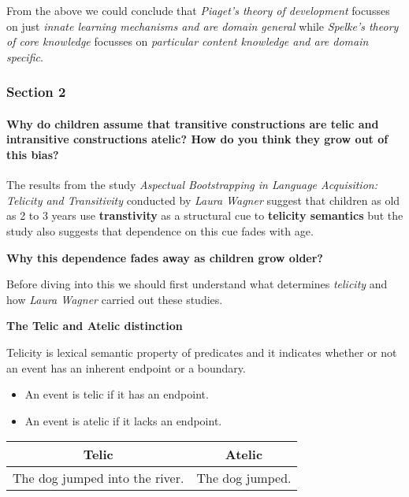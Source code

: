 \documentclass[11pt]{article}
\providecommand{\tightlist}{%
      \setlength{\itemsep}{0pt}\setlength{\parskip}{0pt}}
\begin{document}
From the above we could conclude that \emph{Piaget's theory of
development} focusses on just \emph{innate learning mechanisms and are
domain general} while \emph{Spelke's theory of core knowledge} focusses
on \emph{particular content knowledge and are domain specific}.

    \hypertarget{section-2}{%
\subsubsection{Section 2}\label{section-2}}

\hypertarget{why-do-children-assume-that-transitive-constructions-are-telic-and-intransitive-constructions-atelic-how-do-you-think-they-grow-out-of-this-bias}{%
\paragraph{Why do children assume that transitive constructions are
telic and intransitive constructions atelic? How do you think they grow
out of this
bias?}\label{why-do-children-assume-that-transitive-constructions-are-telic-and-intransitive-constructions-atelic-how-do-you-think-they-grow-out-of-this-bias}}

The results from the study \emph{Aspectual Bootstrapping in Language
Acquisition: Telicity and Transitivity} conducted by \emph{Laura Wagner}
suggest that children as old as 2 to 3 years use \textbf{transtivity} as
a structural cue to \textbf{telicity semantics} but the study also
suggests that dependence on this cue fades with age.

\textbf{Why this dependence fades away as children grow older?}

Before diving into this we should first understand what determines
\emph{telicity} and how \emph{Laura Wagner} carried out these studies.

    \textbf{The Telic and Atelic distinction}

Telicity is lexical semantic property of predicates and it indicates
whether or not an event has an inherent endpoint or a boundary.

\begin{itemize}
\tightlist
\item
  An event is telic if it has an endpoint.
\item
  An event is atelic if it lacks an endpoint.
\end{itemize}

\begin{longtable}[]{@{}cc@{}}
\toprule
Telic & Atelic\tabularnewline
\midrule
\endhead
The dog jumped into the river. & The dog jumped.\tabularnewline
\bottomrule
\end{longtable}
\end{document}
